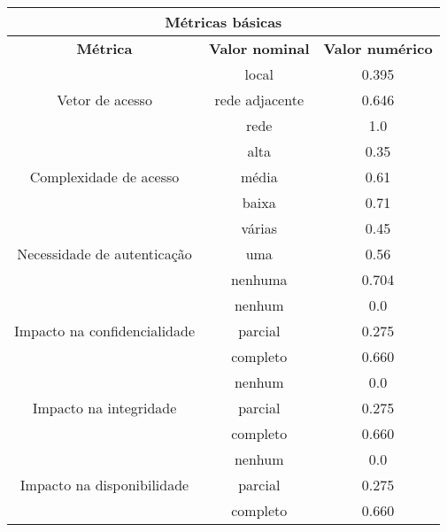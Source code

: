 	\begin{table}
		\begin{tabular}{|c|c|c|}
			\hline
			\multicolumn{3}{|c|}{ \textbf{Métricas básicas} } \\
			\hline
			\textbf{Métrica} & \textbf{Valor nominal} & \textbf{Valor numérico}\\
			\hline
			\multirow{3}{*}{Vetor de acesso} & local & 0.395 \\
			& rede adjacente & 0.646 \\
			& rede & 1.0 \\ 
			\hline
			\multirow{3}{*}{Complexidade de acesso} & alta & 0.35 \\
			& média & 0.61 \\
			& baixa & 0.71 \\
			\hline
			\multirow{3}{*}{Necessidade de autenticação} & várias & 0.45 \\
			& uma & 0.56\\
			& nenhuma & 0.704\\
			\hline
			\multirow{3}{*}{Impacto na confidencialidade} & nenhum & 0.0 \\
			& parcial & 0.275\\
			& completo & 0.660\\
			\hline
			\multirow{3}{*}{Impacto na integridade} & nenhum & 0.0 \\
			& parcial & 0.275\\
			& completo & 0.660\\
			\hline
			\multirow{3}{*}{Impacto na disponibilidade} & nenhum & 0.0 \\
			& parcial & 0.275\\
			& completo & 0.660\\
			\hline
		\end{tabular}
	\end{table}

